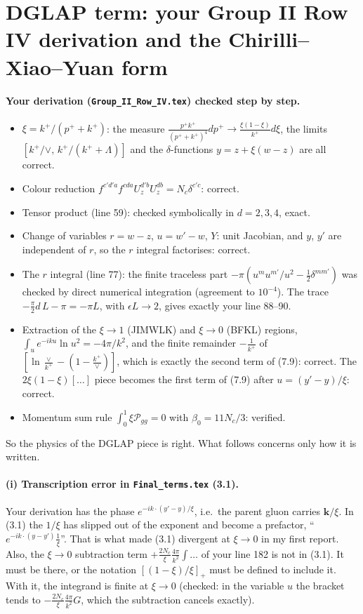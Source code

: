 \documentclass[10pt]{article}
\begin{document}
\section{DGLAP term: your Group II Row IV derivation and the Chirilli--Xiao--Yuan form}\label{sec:dglap}
\paragraph{Your derivation (\texttt{Group\_II\_Row\_IV.tex}) checked step by step.}
\begin{itemize}
\item $\xi=k^+/(p^++k^+)$: the measure $\frac{p^+k^+}{(p^++k^+)^4}dp^+\to\frac{\xi(1-\xi)}{k^+}d\xi$, the limits $[k^+/\vee,\,k^+/(k^++\Lambda)]$ and the $\delta$-functions $y=z+\xi(w-z)$ are all correct.
\item Colour reduction $f^{c'd'a}f^{cda}U^{d'b}_zU^{db}_z=N_c\delta^{c'c}$: correct.
\item Tensor product (line 59): checked symbolically in $d=2,3,4$, exact.
\item Change of variables $r=w-z$, $u=w'-w$, $Y$: unit Jacobian, and $y$, $y'$ are independent of $r$, so the $r$ integral factorises: correct.
\item The $r$ integral (line 77): the finite traceless part $-\pi(u^mu^{m'}/u^2-\tfrac12\delta^{mm'})$ was checked by direct numerical integration (agreement to $10^{-4}$). The trace $-\frac\pi2 d\,L-\pi=-\pi L$, with $\epsilon L\to2$, gives exactly your line 88--90.
\item Extraction of the $\xi\to1$ (JIMWLK) and $\xi\to0$ (BFKL) regions, $\int_u e^{-iku}\ln u^2=-4\pi/k^2$, and the finite remainder $-\frac{1}{k^+}$ of $[\ln\frac{\vee}{k^+}-(1-\frac{k^+}{\vee})]$, which is exactly the second term of (7.9): correct. The $2\xi(1-\xi)[\dots]$ piece becomes the first term of (7.9) after $u=(y'-y)/\xi$: correct.
\item Momentum sum rule $\int_0^1\xi\mathcal P_{gg}=0$ with $\beta_0=11N_c/3$: verified.
\end{itemize}
So the physics of the DGLAP piece is right. What follows concerns only how it is written.

\paragraph{(i) Transcription error in \texttt{Final\_terms.tex} (3.1).} Your derivation has the phase $e^{-ik\cdot(y'-y)/\xi}$, i.e.\ the parent gluon
carries $\mathbf k/\xi$. In (3.1) the $1/\xi$ has slipped out of the exponent and become a prefactor, ``$e^{-ik\cdot(y-y')}\frac1\xi$''. That is
what made (3.1) divergent at $\xi\to0$ in my first report. Also, the $\xi\to0$ subtraction term $+\frac{2N_c}{\xi}\frac{4\pi}{k^2}\int\dots$ of
your line 182 is not in (3.1). It must be there, or the notation $[(1-\xi)/\xi]_+$ must be defined to include it. With it, the integrand is
finite at $\xi\to0$ (checked: in the variable $u$ the bracket tends to $-\frac{2N_c}{\xi}\frac{4\pi}{k^2}G$, which the subtraction cancels exactly).
\end{document}

